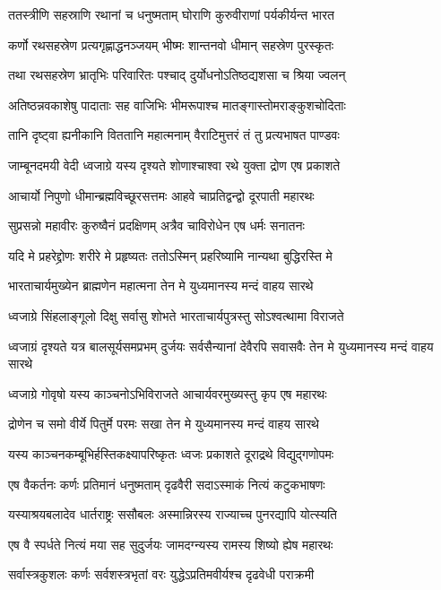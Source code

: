 \twolineshloka
{ततस्त्रीणि सहस्राणि रथानां च धनुष्मताम्}
{घोराणि कुरुवीराणां पर्यकीर्यन्त भारत}


\twolineshloka
{कर्णो रथसहस्रेण प्रत्यगृह्णाद्धनञ्जयम्}
{भीष्मः शान्तनवो धीमान् सहस्रेण पुरस्कृतः}


\twolineshloka
{तथा रथसहस्रेण भ्रातृभिः परिवारितः}
{पश्चाद् दुर्योधनोऽतिष्ठद्यशसा च श्रिया ज्वलन्}


\twolineshloka
{अतिष्ठन्नवकाशेषु पादाताः सह वाजिभिः}
{भीमरूपाश्च मातङ्गास्तोमराङ्कुशचोदिताः}


\twolineshloka
{तानि दृष्ट्वा ह्यनीकानि विततानि महात्मनाम्}
{वैराटिमुत्तरं तं तु प्रत्यभाषत पाण्डवः}


\twolineshloka
{जाम्बूनदमयी वेदी ध्वजाग्रे यस्य दृश्यते}
{शोणाश्चाश्वा रथे युक्ता द्रोण एष प्रकाशते}


\twolineshloka
{आचार्यो निपुणो धीमान्ब्रह्मविच्छूरसत्तमः}
{आहवे चाप्रतिद्वन्द्वो दूरपाती महारथः}


\twolineshloka
{सुप्रसन्नो महावीरः कुरुष्वैनं प्रदक्षिणम्}
{अत्रैव चाविरोधेन एष धर्मः सनातनः}


\twolineshloka
{यदि मे प्रहरेद्द्रोणः शरीरे मे प्रहृष्यतः}
{ततोऽस्मिन् प्रहरिष्यामि नान्यथा बुद्धिरस्ति मे}


\twolineshloka
{भारताचार्यमुख्येन ब्राह्मणेन महात्मना}
{तेन मे युध्यमानस्य मन्दं वाहय सारथे}


\twolineshloka
{ध्वजाग्रे सिंहलाङ्गूलो दिक्षु सर्वासु शोभते}
{भारताचार्यपुत्रस्तु सोऽश्वत्थामा विराजते}


\threelineshloka
{ध्वजाग्रं दृश्यते यत्र बालसूर्यसमप्रभम्}
{दुर्जयः सर्वसैन्यानां देवैरपि सवासवैः}
{तेन मे युध्यमानस्य मन्दं वाहय सारथे}


\twolineshloka
{ध्वजाग्रे गोवृषो यस्य काञ्चनोऽभिविराजते}
{आचार्यवरमुख्यस्तु कृप एष महारथः}


\twolineshloka
{द्रोणेन च समो वीर्ये पितुर्मे परमः सखा}
{तेन मे युध्यमानस्य मन्दं वाहय सारथे}


\twolineshloka
{यस्य काञ्चनकम्बूभिर्हस्तिकक्ष्यापरिष्कृतः}
{ध्वजः प्रकाशते दूराद्रथे विद्युद्गणोपमः}


\twolineshloka
{एष वैकर्तनः कर्णः प्रतिमानं धनुष्मताम्}
{दृढवैरी सदाऽस्माकं नित्यं कटुकभाषणः}


\twolineshloka
{यस्याश्रयबलादेव धार्तराष्ट्रः ससौबलः}
{अस्मान्निरस्य राज्याच्च पुनरद्यापि योत्स्यति}


\twolineshloka
{एष वै स्पर्धते नित्यं मया सह सुदुर्जयः}
{जामदग्न्यस्य रामस्य शिष्यो ह्येष महारथः}


\twolineshloka
{सर्वास्त्रकुशलः कर्णः सर्वशस्त्रभृतां वरः}
{युद्धेऽप्रतिमवीर्यश्च दृढवेधी पराक्रमी}


